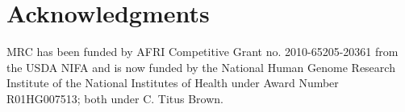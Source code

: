 \documentclass[11pt]{article}
\begin{document}



\section*{Acknowledgments}

MRC has been funded by AFRI Competitive Grant no. 2010-65205-20361
from the USDA NIFA and is now funded by the National Human Genome
Research Institute of the National Institutes of Health under Award
Number R01HG007513; both under C. Titus Brown.




%








\end{document}
